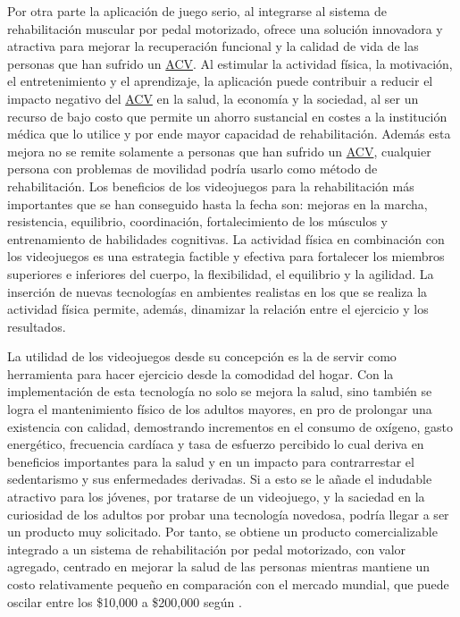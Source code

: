 Por otra parte la aplicación de juego serio, al integrarse al sistema de rehabilitación muscular por pedal motorizado, ofrece una solución innovadora y atractiva para mejorar la recuperación funcional y la calidad de vida de las personas que han sufrido un \hyperlink{page: abbidx}{ACV}. Al estimular la actividad física, la motivación, el entretenimiento y el aprendizaje, la aplicación puede contribuir a reducir el impacto negativo del \hyperlink{page: abbidx}{ACV} en la salud, la economía y la sociedad, al ser un recurso de bajo costo que permite un ahorro sustancial en costes a la institución médica que lo utilice y por ende mayor capacidad de rehabilitación. Además esta mejora no se remite solamente a personas que han sufrido un \hyperlink{page: abbidx}{ACV}, cualquier persona con problemas de movilidad podría usarlo como método de rehabilitación. Los beneficios de los videojuegos para la rehabilitación más importantes que se han conseguido hasta la fecha son: mejoras en la marcha, resistencia, equilibrio, coordinación, fortalecimiento de los músculos y entrenamiento de habilidades cognitivas. La actividad física en combinación con los videojuegos es una estrategia factible y efectiva para fortalecer los miembros superiores e inferiores del cuerpo, la flexibilidad, el equilibrio y la agilidad.  La inserción de nuevas tecnologías en ambientes realistas en los que se realiza la actividad física permite, además, dinamizar la relación entre el ejercicio y los resultados.  

La utilidad de los videojuegos desde su concepción es la de servir como herramienta para hacer ejercicio desde la comodidad del hogar. Con la implementación de esta tecnología no solo se mejora la salud, sino también se logra el mantenimiento físico de los adultos mayores, en pro de prolongar una existencia con calidad, demostrando incrementos en el consumo de oxígeno, gasto energético, frecuencia cardíaca y tasa de esfuerzo percibido lo cual deriva en beneficios importantes para la salud y en un impacto para contrarrestar el sedentarismo y sus enfermedades derivadas. Si a esto se le añade el indudable atractivo para los jóvenes, por tratarse de un videojuego, y la saciedad en la curiosidad de los adultos por probar una tecnología novedosa, podría llegar a ser un producto muy solicitado. Por tanto, se obtiene un producto comercializable integrado a un sistema de rehabilitación por pedal motorizado, con valor agregado, centrado en mejorar la salud de las personas mientras mantiene un costo relativamente pequeño en comparación con el mercado mundial, que puede oscilar entre los \$10,000 a \$200,000 según \cite{Costodeh3}.
